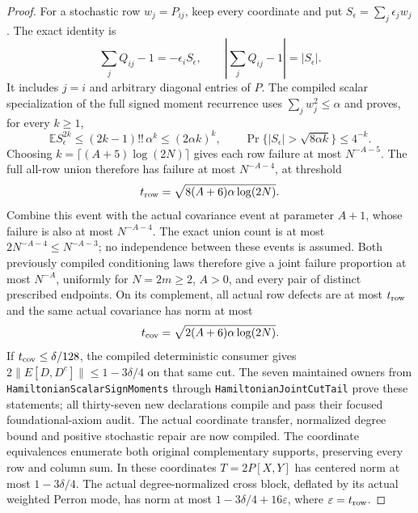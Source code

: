 \begin{proof}
For a stochastic row \(w_j=P_{ij}\), keep every coordinate and put
\(S_\epsilon=\sum_j\epsilon_jw_j\). The exact identity is
\[
 \sum_j Q_{ij}-1=-\epsilon_iS_\epsilon,\qquad
 \left|\sum_j Q_{ij}-1\right|=|S_\epsilon|.
\]
It includes \(j=i\) and arbitrary diagonal entries of \(P\).
The compiled scalar specialization of the full signed moment recurrence
uses \(\sum_jw_j^2\leq\alpha\) and proves, for every \(k\geq1\),
\[
 \mathbb E S_\epsilon^{2k}\leq(2k-1)!!\,\alpha^k
       \leq(2\alpha k)^k,\qquad
 \Pr\{|S_\epsilon|>\sqrt{8\alpha k}\}\leq4^{-k}.
\]
Choosing \(k=\lceil(A+5)\log(2N)\rceil\) gives each row failure
at most \(N^{-A-5}\). The full all-row union therefore has failure
at most \(N^{-A-4}\), at threshold
\[
 t_{\rm row}=\sqrt{8(A+6)\alpha\log(2N)}.
\]
Combine this event with the actual covariance event at parameter
\(A+1\), whose failure is also at most \(N^{-A-4}\).
The exact union count is at most \(2N^{-A-4}\leq N^{-A-3}\);
no independence between these events is assumed.
Both previously compiled conditioning laws therefore give a
joint failure proportion at most \(N^{-A}\), uniformly for
\(N=2m\geq2\), \(A>0\), and every pair of distinct prescribed endpoints.
On its complement, all actual row defects are at most \(t_{\rm row}\)
and the same actual covariance has norm at most
\[
 t_{\rm cov}=\sqrt{2(A+6)\alpha\log(2N)}.
\]
If \(t_{\rm cov}\leq\delta/128\), the compiled deterministic
consumer gives \(2\|E[D,D^c]\|\leq1-3\delta/4\) on that same cut.
The seven maintained owners from \texttt{HamiltonianScalarSignMoments}
through \texttt{HamiltonianJointCutTail} prove these statements;
all thirty-seven new declarations compile and pass their focused
foundational-axiom audit.
The actual coordinate transfer, normalized degree bound and
positive stochastic repair are now compiled.
The coordinate equivalences enumerate both original complementary
supports, preserving every row and column sum. In these coordinates
\(T=2P[X,Y]\) has centered norm at most \(1-3\delta/4\).
The actual degree-normalized cross block, deflated by its actual
weighted Perron mode, has norm at most
\(1-3\delta/4+16\varepsilon\), where \(\varepsilon=t_{\rm row}\).


\end{proof}
